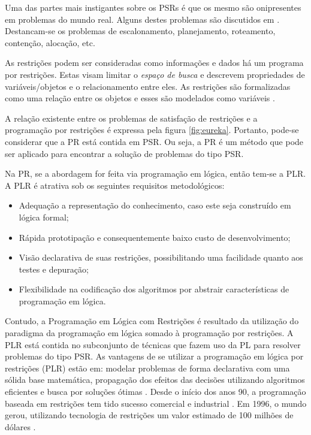 Uma das   partes mais instigantes sobre os PSRs é que os mesmo são onipresentes
em problemas do mundo real. Alguns destes  problemas são discutidos em \cite{rossi_2006}.
Destancam-se os problemas de escalonamento, planejamento, roteamento, contenção,
alocação, etc.

As restrições podem ser consideradas como informações e dados há um programa por restrições. 
Estas  visam limitar o \textit{espaço de busca} e descrevem propriedades de 
variáveis/objetos e o relacionamento entre eles. As restrições são formalizadas como uma relação entre os objetos e esses são modelados como variáveis \cite{fruewirth2003}.

A relação existente entre os problemas de satisfação de restrições e a programação por restrições é expressa pela figura \ref{fig:eureka}. Portanto, pode-se considerar que a PR está contida em PSR. Ou seja, a PR é um método que pode ser aplicado para encontrar a solução de problemas do tipo PSR.

Na PR, se a abordagem for feita via programação em lógica, então tem-se a PLR. A PLR é atrativa sob os seguintes requisitos metodológicos:

\begin{itemize}
\item Adequação a representação do conhecimento, caso este seja construído em lógica formal;
\item Rápida prototipação e consequentemente baixo custo de desenvolvimento;
\item Visão declarativa de suas restrições, possibilitando uma facilidade quanto aos testes e depuração;
\item Flexibilidade na codificação dos algoritmos por abstrair características de programação em lógica.
\end{itemize}

Contudo, a Programação em Lógica com Restrições é resultado da utilização do paradigma da programação em lógica somado à programação por restrições. A PLR está contida no subconjunto de técnicas que fazem uso da PL para resolver problemas do tipo PSR. As vantagens de se utilizar a programação em lógica por restrições (PLR) estão em: modelar problemas de forma declarativa com uma sólida base matemática, propagação dos efeitos das decisões utilizando algoritmos eficientes e busca por soluções ótimas \cite{fruewirth2003}. Desde o início dos anos 90, a programação baseada em restrições tem tido sucesso comercial e industrial \cite{RusNorv2010}. Em 1996, o mundo gerou, utilizando tecnologia de restrições um valor estimado de 100 milhões de dólares \cite{fruewirth2003}.


